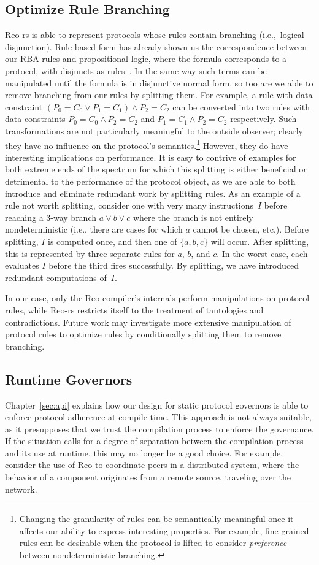 \subsection{Optimize Rule Branching}
\label{sec:future_branches}
Reo-rs is able to represent protocols whose rules contain branching (i.e.,\ logical disjunction). Rule-based form has already shown us the correspondence between our RBA rules and propositional logic, where the formula corresponds to a protocol, with disjuncts as rules~\cite{dokter2018rule}. In the same way such terms can be manipulated until the formula is in disjunctive normal form, so too are we able to remove branching from our rules by splitting them. For example, a rule with data constraint $(P_0=C_0\vee{}P_1=C_1)\wedge{}P_2=C_2$ can be converted into two rules with data constraints $P_0=C_0\wedge{}P_2=C_2$ and $P_1=C_1\wedge{}P_2=C_2$ respectively. Such transformations are not particularly meaningful to the outside observer; clearly they have  no influence on the protocol's semantics.\footnote{Changing the granularity of rules can be semantically meaningful once it affects our ability to express interesting properties. For example, fine-grained rules can be desirable when the protocol is lifted to consider \textit{preference} between nondeterministic branching.} However, they do have interesting implications on performance. It is easy to contrive of examples for both extreme ends of the spectrum for which this splitting is either beneficial or detrimental to the performance of the protocol object, as we are able to both introduce and eliminate redundant work by splitting rules. As an example of a rule not worth splitting, consider one with very many instructions~$I$ before reaching a 3-way branch $a\vee{}b\vee{}c$ where the branch is not entirely nondeterministic (i.e., there are cases for which $a$ cannot be chosen, etc.). Before splitting, $I$ is computed once, and then one of $\{a,b,c\}$ will occur. After splitting, this is represented by three separate rules for $a$, $b$, and $c$. In the worst case, each evaluates $I$ before the third fires successfully. By splitting, we have introduced redundant computations of~$I$.

In our case, only the Reo compiler's internals perform manipulations on protocol rules, while Reo-rs restricts itself to the treatment of tautologies and contradictions. Future work may investigate more extensive manipulation of protocol rules to optimize rules by conditionally splitting them to remove branching.

\subsection{Runtime Governors}
Chapter~\ref{sec:api} explains how our design for static protocol governors is able to enforce protocol adherence at compile time. This approach is not always suitable, as it presupposes that we trust the compilation process to enforce the governance. If the situation calls for a degree of separation between the compilation process and its use at runtime, this may no longer be a good choice. For example, consider the use of Reo to coordinate peers in a distributed system, where the behavior of a component originates from a remote source, traveling over the network.

